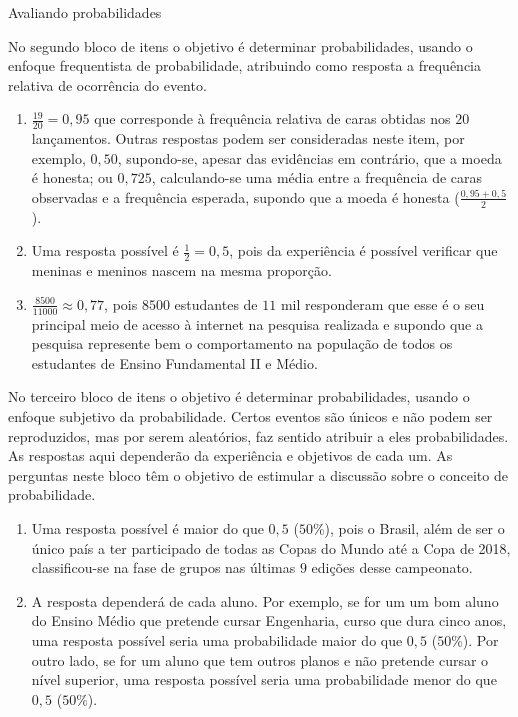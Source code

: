 \begin{answer}{Avaliando probabilidades}
{
  No segundo bloco de itens o objetivo é determinar probabilidades, usando o enfoque frequentista de probabilidade, atribuindo como resposta a frequência relativa de ocorrência do evento.
  \begin{enumerate}
  \item $\frac{19}{20}=0{,}95$ que corresponde à frequência relativa de caras obtidas nos $20$ lançamentos. Outras respostas podem ser consideradas neste item, por exemplo, $0,50$, supondo-se, apesar das evidências em contrário, que a moeda é honesta; ou $0{,}725$, calculando-se uma média entre a frequência de caras observadas e a frequência esperada, supondo que a moeda é honesta ($\frac{0{,}95+0{,}5}{2}$).
  \item Uma resposta possível é $\frac{1}{2}=0{,}5$, pois da experiência é possível verificar que meninas e meninos nascem na mesma proporção.
  \item $\frac{8500}{11000}\approx0{,}77$, pois $8500$ estudantes de $11$ mil responderam que esse é o seu principal meio de acesso à internet na pesquisa realizada e supondo que a pesquisa represente bem o comportamento na população de todos os estudantes de Ensino Fundamental II e Médio.
  \end{enumerate}

  No terceiro bloco de itens o objetivo é determinar probabilidades, usando o enfoque subjetivo da probabilidade. Certos eventos são únicos e não podem ser reproduzidos, mas por serem aleatórios, faz sentido atribuir a eles probabilidades. As respostas aqui dependerão da experiência e objetivos de cada um. As perguntas neste bloco têm o objetivo de estimular a discussão sobre o conceito de probabilidade.
  \begin{enumerate}
  \item Uma resposta possível é maior do que $0,5$ ($50\%$), pois o Brasil, além de ser o único país a ter participado de todas as Copas do Mundo até a Copa de 2018, classificou-se na fase de grupos nas últimas $9$ edições desse campeonato.
  \item A resposta dependerá de cada aluno. Por exemplo, se for um um bom aluno do Ensino Médio que pretende cursar Engenharia, curso que dura cinco anos, uma resposta possível seria uma probabilidade maior do que $0{,}5$ ($50\%$). Por outro lado, se for um aluno que tem outros planos e não pretende cursar o nível superior, uma resposta possível seria uma probabilidade menor do que $0{,}5$ ($50\%$).
  \end{enumerate}

}
\end{answer}
